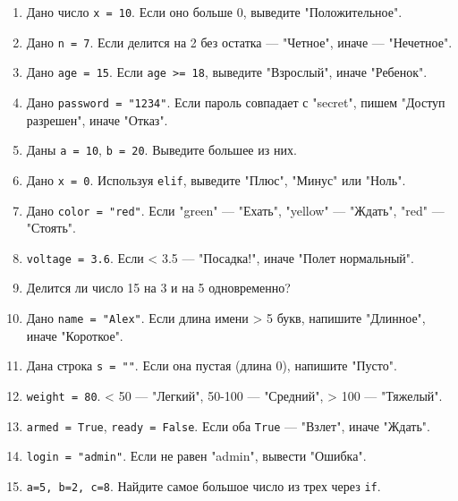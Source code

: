 \begin{enumerate}
    \item Дано число \texttt{x = 10}. Если оно больше 0, выведите "Положительное".
    \item Дано \texttt{n = 7}. Если делится на 2 без остатка — "Четное", иначе — "Нечетное".
    \item Дано \texttt{age = 15}. Если \texttt{age >= 18}, выведите "Взрослый", иначе "Ребенок".
    \item Дано \texttt{password = "1234"}. Если пароль совпадает с "secret", пишем "Доступ разрешен", иначе "Отказ".
    \item Даны \texttt{a = 10}, \texttt{b = 20}. Выведите большее из них.
    \item Дано \texttt{x = 0}. Используя \texttt{elif}, выведите "Плюс", "Минус" или "Ноль".
    \item Дано \texttt{color = "red"}. Если "green" — "Ехать", "yellow" — "Ждать", "red" — "Стоять".
    \item \texttt{voltage = 3.6}. Если < 3.5 — "Посадка!", иначе "Полет нормальный".
    \item Делится ли число 15 на 3 и на 5 одновременно?
    \item Дано \texttt{name = "Alex"}. Если длина имени > 5 букв, напишите "Длинное", иначе "Короткое".
    \item Дана строка \texttt{s = ""}. Если она пустая (длина 0), напишите "Пусто".
    \item \texttt{weight = 80}. < 50 — "Легкий", 50-100 — "Средний", > 100 — "Тяжелый".
    \item \texttt{armed = True}, \texttt{ready = False}. Если оба \texttt{True} — "Взлет", иначе "Ждать".
    \item \texttt{login = "admin"}. Если не равен "admin", вывести "Ошибка".
    \item \texttt{a=5, b=2, c=8}. Найдите самое большое число из трех через \texttt{if}.
\end{enumerate}

